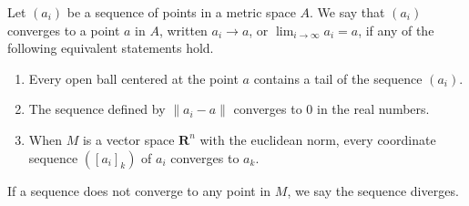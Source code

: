 \begin{definition}
  Let $(a_i)$ be a sequence of points in a metric space $A$. We say that $(a_i)$ converges to a point $a$ in $A$, written $a_i \to a$, or $\lim_{i \to \infty} a_i = a$, if any of the following equivalent statements hold.
  \begin{enumerate}
    \item Every open ball centered at the point $a$ contains a tail of the sequence $(a_i)$.
    \item The sequence defined by $\| a_i - a \|$ converges to 0 in the real numbers.
    \item When $M$ is a vector space $\mathbf{R}^n$ with the euclidean norm, every coordinate sequence $([a_i]_k)$ of $a_i$ converges to $a_k$.
  \end{enumerate}
  If a sequence does not converge to any point in $M$, we say the sequence diverges.
\end{definition}
